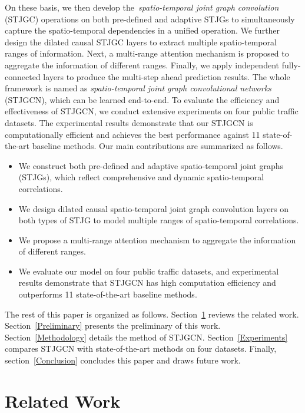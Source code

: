 \documentclass[10pt,journal,compsoc]{IEEEtran}
\begin{document}
On these basis, we then develop the~\textit{spatio-temporal joint graph convolution} (STJGC) operations on both pre-defined and adaptive STJGs to simultaneously capture the spatio-temporal dependencies in a unified operation. We further design the dilated causal STJGC layers to extract multiple spatio-temporal ranges of information. Next, a multi-range attention mechanism is proposed to aggregate the information of different ranges. Finally, we apply independent fully-connected layers to produce the multi-step ahead prediction results. The whole framework is named as \textit{spatio-temporal joint graph convolutional networks} (STJGCN), which can be learned end-to-end. To evaluate the efficiency and effectiveness of STJGCN, we conduct extensive experiments on four public traffic datasets. The experimental results demonstrate that our STJGCN is computationally efficient and achieves the best performance against 11 state-of-the-art baseline methods. Our main contributions are summarized as follows.

\begin{itemize}
	\item We construct both pre-defined and adaptive spatio-temporal joint graphs (STJGs), which reflect comprehensive and dynamic spatio-temporal correlations. 
	\item We design dilated causal spatio-temporal joint graph convolution layers on both types of STJG to model multiple ranges of spatio-temporal correlations.
	\item We propose a multi-range attention mechanism to aggregate the information of different ranges. 
	\item We evaluate our model on four public traffic datasets, and experimental results demonstrate that STJGCN has high computation efficiency and outperforms 11 state-of-the-art baseline methods.
\end{itemize}

The rest of this paper is organized as follows. Section~\ref{Related Work} reviews the related work. Section~\ref{Preliminary} presents the preliminary of this work. Section~\ref{Methodology} details the method of STJGCN. Section~\ref{Experiments} compares STJGCN with state-of-the-art methods on four datasets. Finally, section~\ref{Conclusion} concludes this paper and draws future work.

\section{Related Work} \label{Related Work}
\end{document}
